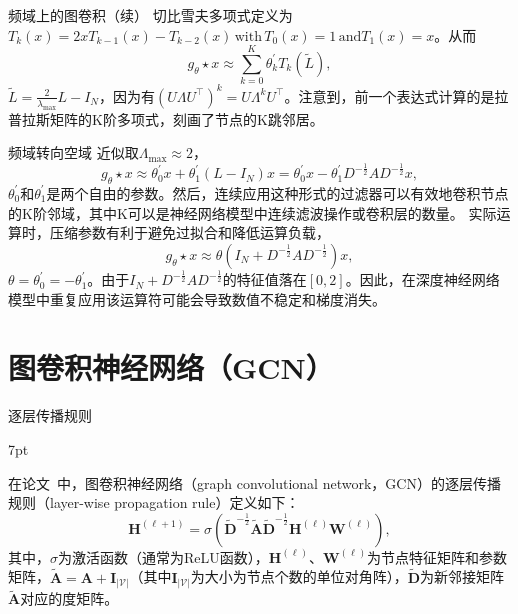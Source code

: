 \documentclass{beamer}
\newenvironment{formal}{%
	\def\FrameCommand{%
		\hspace{1pt}%
		{\color{deepgreen}\vrule width 2pt}%
		{\color{greenshade}\vrule width 4pt}%
		\colorbox{greenshade}%
	}%
	\MakeFramed{\advance\hsize-\width\FrameRestore}%
	\noindent\hspace{-4.55pt}%
	\begin{adjustwidth}{}{7pt}%
		\vspace{2pt}\vspace{2pt}%
	}
	{%
		\vspace{2pt}
	\end{adjustwidth}\endMakeFramed%
}
\begin{document}
\begin{frame}{频域上的图卷积（续）}
	切比雪夫多项式定义为$T_k\left(x\right)=2xT_{k-1}\left(x\right)-T_{k-2}\left(x\right)\,\text{with}\,T_0\left(x\right)=1\,\text{and}T_1\left(x\right)=x$。从而
	\begin{equation}
		g_\theta\star x\approx\sum\limits_{k=0}^K\theta^\prime_kT_k\left(\tilde{L}\right),
	\end{equation}
	$\tilde{L}=\frac{2}{\lambda_{\text{max}}}L-I_N$，因为有$\left(U\Lambda U^\top\right)^k=U\Lambda^kU^\top$。注意到，前一个表达式计算的是拉普拉斯矩阵的K阶多项式，刻画了节点的K跳邻居。
\end{frame}

\begin{frame}{频域转向空域}
	近似取$\Lambda_{\text{max}}\approx2$，
	\begin{equation}
		g_\theta\star x\approx\theta^\prime_0x+\theta^\prime_1\left(L-I_N\right)x=\theta^\prime_0x-\theta^\prime_1D^{-\frac{1}{2}}AD^{-\frac{1}{2}}x,
	\end{equation}
	$\theta^\prime_0$和$\theta^\prime_1$是两个自由的参数。然后，连续应用这种形式的过滤器可以有效地卷积节点的K阶邻域，其中K可以是神经网络模型中连续滤波操作或卷积层的数量。
	实际运算时，压缩参数有利于避免过拟合和降低运算负载，
	\begin{equation}
		g_\theta\star x\approx\theta\left(I_N+D^{-\frac{1}{2}}AD^{-\frac{1}{2}}\right)x,
	\end{equation}
	$\theta=\theta^\prime_0=-\theta^\prime_1$。由于$I_N+D^{-\frac{1}{2}}AD^{-\frac{1}{2}}$的特征值落在$\left[0,2\right]$。因此，在深度神经网络模型中重复应用该运算符可能会导致数值不稳定和梯度消失。
\end{frame}



\section{图卷积神经网络（GCN）}



\begin{frame}{逐层传播规则}
	\begin{formal}
		在论文~\cite{kipf2017gcn}中，图卷积神经网络（graph convolutional network，GCN）的逐层传播规则（layer-wise propagation rule）定义如下：
		\begin{equation}
			\label{eq:gcnlp}
			\textbf{H}^{\left(\ell+1\right)}=\sigma\left(\tilde{\textbf{D}}^{-\frac{1}{2}}\tilde{\textbf{A}}\tilde{\textbf{D}}^{-\frac{1}{2}}\textbf{H}^{\left(\ell\right)}\textbf{W}^{\left(\ell\right)}\right),
		\end{equation}
		其中，$\sigma$为激活函数（通常为ReLU函数），$\textbf{H}^{\left(\ell\right)}$、$\textbf{W}^{\left(\ell\right)}$为节点特征矩阵和参数矩阵，$\tilde{\textbf{A}}=\textbf{A}+\textbf{I}_{\left|\mathscr{V}\right|}$（其中$\textbf{I}_{\left|\mathscr{V}\right|}$为大小为节点个数的单位对角阵），$\tilde{\textbf{D}}$为新邻接矩阵$\tilde{\textbf{A}}$对应的度矩阵。
	\end{formal}
\end{frame}
\end{document}
